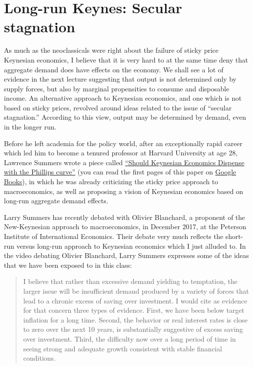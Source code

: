 \documentclass[]{book}
\begin{document}
\section{Long-run Keynes: Secular
stagnation}\label{long-run-keynes-secular-stagnation}

As much as the neoclassicals were right about the failure of sticky
price Keynesian economics, I believe that it is very hard to at the same
time deny that aggregate demand does have effects on the economy. We
shall see a lot of evidence in the next lecture suggesting that output
is not determined only by supply forces, but also by marginal
propensities to consume and disposable income. An alternative approach
to Keynesian economics, and one which is not based on sticky prices,
revolved around ideas related to the issue of ``secular stagnation.''
According to this view, output may be determined by demand, even in the
longer run.

Before he left academia for the policy world, after an exceptionally
rapid career which led him to become a tenured professor at Harvard
University at age 28, Lawrence Summers wrote a piece called
\href{bib/Summers1991.pdf}{``Should Keynesian Economics Dispense with
the Phillips curve''} (you can read the first pages of this paper on
\href{https://books.google.com/books?id=JJm-DAAAQBAJ\&pg=PP1\&dq=Issues+in+Contemporary+Economics:+Volume+2\&hl=en\&sa=X\&ved=0ahUKEwjEpb7AhfjeAhUjMXwKHdpyBWkQuwUIPzAF\#v=onepage\&q=Issues\%20in\%20Contemporary\%20Economics\%3A\%20Volume\%202\&f=false}{Google
Books}), in which he was already criticizing the sticky price approach
to macroeconomics, as well as proposing a vision of Keynesian economics
based on long-run aggregate demand effects.

Larry Summers has recently debated with Olivier Blanchard, a proponent
of the New-Keynesian approach to macroeconomics, in December 2017, at
the Peterson Institute of International Economics. Their debate very
much reflects the short-run versus long-run approach to Keynesian
economics which I just alluded to. In the video debating Olivier
Blanchard, Larry Summers expresses some of the ideas that we have been
exposed to in this class:

\begin{quote}
I believe that rather than excessive demand yielding to temptation, the
larger issue will be insufficient demand produced by a variety of forces
that lead to a chronic excess of saving over investment. I would cite as
evidence for that concern three types of evidence. First, we have been
below target inflation for a long time. Second, the behavior or real
interest rates is close to zero over the next 10 years, is substantially
suggestive of excess saving over investment. Third, the difficulty now
over a long period of time in seeing strong and adequate growth
consistent with stable financial conditions.
\end{quote}
\end{document}
